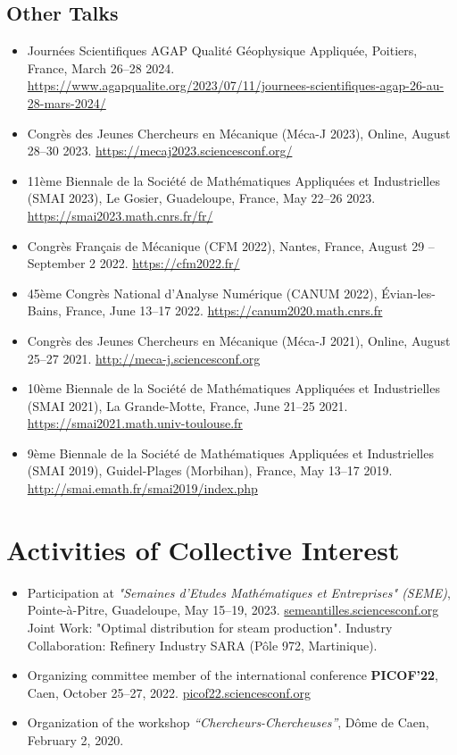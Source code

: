 \documentclass[10pt]{article}
\begin{document}
\subsection{Other Talks}
\begin{itemize}
\item Journées Scientifiques AGAP Qualité Géophysique Appliquée, Poitiers, France, March 26--28 2024. \url{https://www.agapqualite.org/2023/07/11/journees-scientifiques-agap-26-au-28-mars-2024/}
\item Congrès des Jeunes Chercheurs en Mécanique (Méca-J 2023), Online, August 28--30 2023. \url{https://mecaj2023.sciencesconf.org/}
\item 11ème Biennale de la Société de Mathématiques Appliquées et Industrielles (SMAI 2023), Le Gosier, Guadeloupe, France, May 22--26 2023. \url{https://smai2023.math.cnrs.fr/fr/}
\item Congrès Français de Mécanique (CFM 2022), Nantes, France, August 29 -- September 2 2022. \url{https://cfm2022.fr/}
\item 45ème Congrès National d'Analyse Numérique (CANUM 2022), Évian-les-Bains, France, June 13--17 2022. \url{https://canum2020.math.cnrs.fr}
\item Congrès des Jeunes Chercheurs en Mécanique (Méca-J 2021), Online, August 25--27 2021. \url{http://meca-j.sciencesconf.org}
\item 10ème Biennale de la Société de Mathématiques Appliquées et Industrielles (SMAI 2021), La Grande-Motte, France, June 21--25 2021. \url{https://smai2021.math.univ-toulouse.fr}
\item 9ème Biennale de la Société de Mathématiques Appliquées et Industrielles (SMAI 2019), Guidel-Plages (Morbihan), France, May 13--17 2019. \url{http://smai.emath.fr/smai2019/index.php}
\end{itemize}


\section{Activities of Collective Interest}

\begin{itemize}
  \item Participation at \textit{"Semaines d'Etudes Mathématiques et Entreprises" (SEME)},  
  Pointe-à-Pitre, Guadeloupe, May 15–19, 2023.  
  \href{https://semeantilles.sciencesconf.org/}{semeantilles.sciencesconf.org}  
  Joint Work: "Optimal distribution for steam production".
  Industry Collaboration: Refinery Industry SARA (Pôle 972, Martinique).

  \item Organizing committee member of the international conference \textbf{PICOF’22},  
  Caen, October 25–27, 2022.  
  \href{https://picof22.sciencesconf.org/}{picof22.sciencesconf.org}

  \item Organization of the workshop \textit{“Chercheurs-Chercheuses”},  
  Dôme de Caen, February 2, 2020.
\end{itemize}
\end{document}
